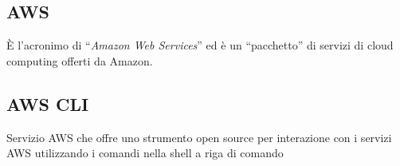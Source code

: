 
\subsection{AWS}
È l’acronimo di “\textit{Amazon Web Services}” ed è un “pacchetto” di servizi di cloud computing offerti da Amazon. 

\subsection{AWS CLI}
Servizio AWS che offre uno strumento open source per interazione con i servizi AWS utilizzando i comandi nella shell a riga di comando

\clearpage 